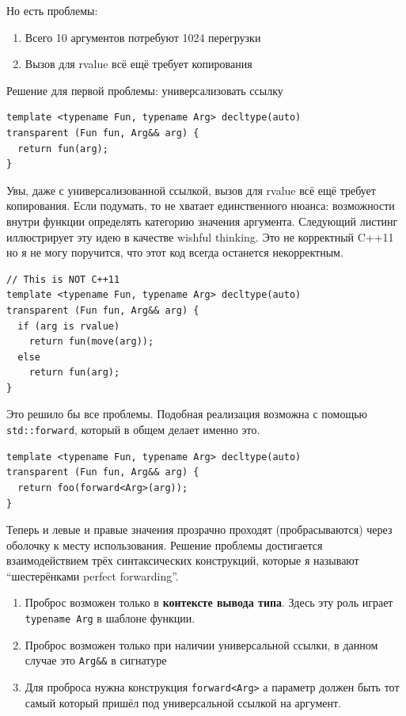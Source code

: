 \documentclass[a4paper,12pt,oneside]{article}
\begin{document}
Но есть проблемы: 

\begin{enumerate}
\item Всего 10 аргументов потребуют 1024 перегрузки
\item Вызов для rvalue всё ещё требует копирования
\end{enumerate}

Решение для первой проблемы: универсализовать ссылку

\begin{lstlisting}
template <typename Fun, typename Arg> decltype(auto)
transparent (Fun fun, Arg&& arg) {
  return fun(arg);
}
\end{lstlisting}

Увы, даже с универсализованной ссылкой, вызов для rvalue всё ещё требует копирования. Если подумать, то не хватает единственного нюанса: возможности внутри функции определять категорию значения аргумента. Следующий листинг иллюстрирует эту идею в качестве wishful thinking. Это не корректный C++11 но я не могу поручится, что этот код всегда останется некорректным.

\begin{lstlisting}
// This is NOT C++11
template <typename Fun, typename Arg> decltype(auto)
transparent (Fun fun, Arg&& arg) {
  if (arg is rvalue)
    return fun(move(arg));
  else
    return fun(arg);
}
\end{lstlisting}

Это решило бы все проблемы. Подобная реализация возможна с помощью \lstinline!std::forward!, который в общем делает именно это.

\begin{lstlisting}
template <typename Fun, typename Arg> decltype(auto)
transparent (Fun fun, Arg&& arg) {
  return foo(forward<Arg>(arg));
}
\end{lstlisting}

Теперь и левые и правые значения прозрачно проходят (пробрасываются) через оболочку к месту использования. Решение проблемы достигается взаимодействием трёх синтаксических конструкций, которые я называют ``шестерёнками perfect forwarding''.

\begin{enumerate}
\item Проброс возможен только в \textbf{контексте вывода типа}. Здесь эту роль играет \lstinline!typename Arg! в шаблоне функции.
\item Проброс возможен только при наличии универсальной ссылки, в данном случае это \lstinline!Arg&&! в сигнатуре
\item Для проброса нужна конструкция \lstinline!forward<Arg>! а параметр должен быть тот самый который пришёл под универсальной ссылкой на аргумент.
\end{enumerate}
\end{document}

